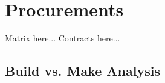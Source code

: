 \clearpage
\section {Procurements}
Matrix here...
Contracts here...
\subsection {Build vs. Make Analysis}
